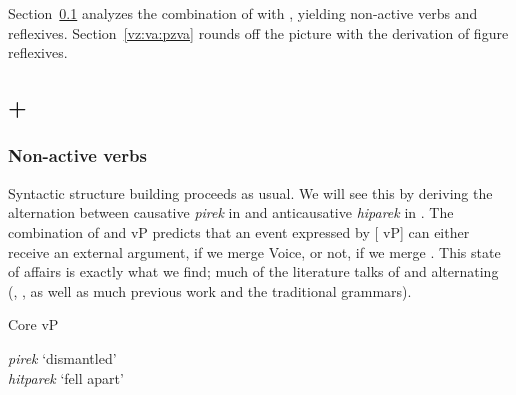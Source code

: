 Section~\ref{vz:va:vzva} analyzes the combination of {\va} with {\vz}, yielding non-active verbs and reflexives. Section~\ref{vz:va:pzva} rounds off the picture with the derivation of figure reflexives.

	\subsection{{\va} + {\vz}} \label{vz:va:vzva}
		\subsubsection{Non-active verbs} \label{vz:va:vzva:nact}
Syntactic structure building proceeds as usual. We will see this by deriving the alternation between causative \emph{pirek} in {\tpie} and anticausative \emph{hiparek} in {\thit}. The combination of {\va} and vP predicts that an event expressed by [{\va} vP] can either receive an external argument, if we merge Voice, or not, if we merge {\vz}. This state of affairs is exactly what we find; much of the literature talks of {\tpie} and {\thit} alternating (\citealt{doron03}, \citealt{arad05}, as well as much previous work and the traditional grammars).

\pex
	\a Core vP\\

	
	
	\a \emph{pirek} `dismantled'\\
	\a \emph{hitparek} `fell apart'\\
	
